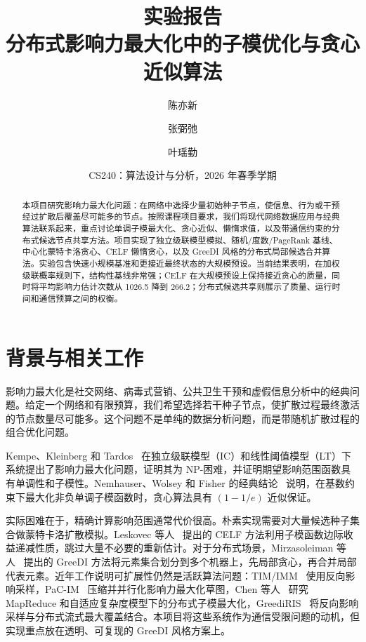 \documentclass[UTF8, 11pt]{ctexart}
\title{\textbf{实验报告}\\
分布式影响力最大化中的子模优化与贪心近似算法}
\author{陈亦新 \and 张弼弛 \and 叶瑶勤}
\date{CS240：算法设计与分析，2026 年春季学期}
\begin{document}
\maketitle

\begin{abstract}
本项目研究影响力最大化问题：在网络中选择少量初始种子节点，使信息、行为或干预经过扩散后覆盖尽可能多的节点。按照课程项目要求，我们将现代网络数据应用与经典算法联系起来，重点讨论单调子模最大化、贪心近似、懒惰求值，以及带通信约束的分布式候选节点共享方法。项目实现了独立级联模型模拟、随机/度数/PageRank 基线、中心化蒙特卡洛贪心、CELF 懒惰贪心，以及 GreeDI 风格的分布式局部候选合并算法。实验包含快速小规模基准和更接近最终状态的大规模预设。当前结果表明，在加权级联概率规则下，结构性基线非常强；CELF 在大规模预设上保持接近贪心的质量，同时将平均影响力估计次数从 1026.5 降到 266.2；分布式候选共享则展示了质量、运行时间和通信预算之间的权衡。
\end{abstract}

\section{背景与相关工作}

影响力最大化是社交网络、病毒式营销、公共卫生干预和虚假信息分析中的经典问题。给定一个网络和有限预算，我们希望选择若干种子节点，使扩散过程最终激活的节点数量尽可能多。这个问题不是单纯的数据分析问题，而是带随机扩散过程的组合优化问题。

Kempe、Kleinberg 和 Tardos~\cite{kempe2003} 在独立级联模型（IC）和线性阈值模型（LT）下系统提出了影响力最大化问题，证明其为 NP-困难，并证明期望影响范围函数具有单调性和子模性。Nemhauser、Wolsey 和 Fisher 的经典结论~\cite{nemhauser1978} 说明，在基数约束下最大化非负单调子模函数时，贪心算法具有 $(1-1/e)$ 近似保证。

实际困难在于，精确计算影响范围通常代价很高。朴素实现需要对大量候选种子集合做蒙特卡洛扩散模拟。Leskovec 等人~\cite{leskovec2007} 提出的 CELF 方法利用子模函数边际收益递减性质，跳过大量不必要的重新估计。对于分布式场景，Mirzasoleiman 等人~\cite{mirzasoleiman2013} 提出的 GreeDI 方法将元素集合划分到多个机器上，先局部贪心，再合并局部代表元素。近年工作说明可扩展性仍然是活跃算法问题：TIM/IMM~\cite{tang2014,tang2015} 使用反向影响采样，PaC-IM~\cite{wang2023} 压缩并并行化影响力最大化草图，Chen 等人~\cite{chen2024} 研究 MapReduce 和自适应复杂度模型下的分布式子模最大化，GreediRIS~\cite{barik2025} 将反向影响采样与分布式流式最大覆盖结合。本项目将这些系统作为通信受限问题的动机，但实现重点放在透明、可复现的 GreeDI 风格方案上。
\end{document}
